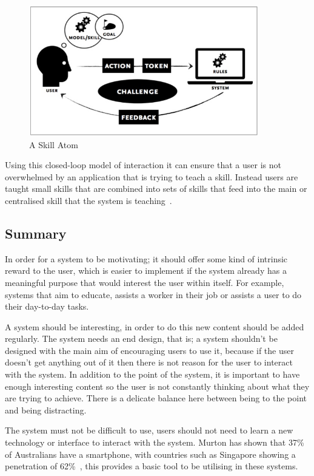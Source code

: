 \documentclass[a4paper,12pt]{article}
\begin{document}
\begin{figure}[ht!]
	\centering
	\includegraphics[width=100mm]{./images/skill-atom}
	\caption{A Skill Atom~\citep{Skill-atoms}}
	\label{skill-atom}
\end{figure}

\par
Using this closed-loop model of interaction it can ensure that a user is not overwhelmed by an application that is trying to teach a skill.
Instead users are taught small skills that are combined into sets of skills that feed into the main or centralised skill that the system is teaching~\citep{applications-as-stories,Skill-atoms}.

\subsection{Summary}
In order for a system to be motivating; it should offer some kind of intrinsic reward to the user, which is easier to implement if the system already has a meaningful purpose that would interest the user within itself. 
For example, systems that aim to educate, assists a worker in their job or assists a user to do their day-to-day tasks.

\par
A system should be interesting, in order to do this new content should be added regularly. 
The system needs an end design, that is; a system shouldn't be designed with the main aim of encouraging users to use it, because if the user doesn't get anything out of it then there is not reason for the user to interact with the system. 
In addition to the point of the system, it is important to have enough interesting content so the user is not constantly thinking about what they are trying to achieve. 
There is a delicate balance here between being to the point and being distracting.

\par
The system must not be difficult to use, users should not need to learn a new technology or interface to interact with the system. 
Murton has shown that 37\% of Australians have a smartphone, with countries such as Singapore showing a penetration of 62\%~\citep{smartphone-use-in-au}, this provides a basic tool to be utilising in these systems.
\end{document}
